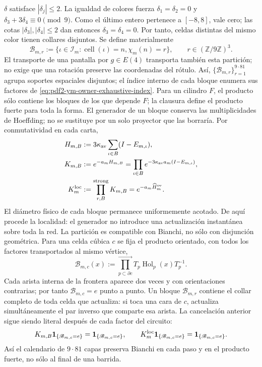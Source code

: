 $\delta$ satisface $|\delta_j|\le2$. La igualdad de colores fuerza
$\delta_1=\delta_2=0$ y
$\delta_3+3\delta_4\equiv0\pmod9$. Como el último entero pertenece a
$[-8,8]$, vale cero; las cotas $|\delta_3|,|\delta_4|\le2$ dan entonces
$\delta_3=\delta_4=0$. Por tanto, celdas distintas del mismo color tienen
collares disjuntos. Se define materialmente
\begin{equation}\label{eq:pdf2-ym-owner-729-blocks}
 \mathcal B_{m,r}:=\{\iota\in\mathcal I_m:
   \operatorname{cell}(\iota)=n, \chi_m(n)=r\},
 \qquad r\in(\mathbb Z/9\mathbb Z)^3.
\end{equation}
El transporte de una pantalla por $g\in E(4)$ transporta también esta
partición; no exige que una rotación preserve las coordenadas del rótulo.
Así, $\{\mathcal B_{m,r}\}_{r=1}^{9\cdot81}$ agrupa soportes espaciales
disjuntos;
el índice interno de cada bloque enumera sus factores de
\eqref{eq:pdf2-ym-owner-exhaustive-index}. Para un cilindro $F$, el producto sólo
contiene los bloques de los que depende $F$; la clausura define el producto fuerte
para toda la forma. El generador de un bloque conserva las multiplicidades de
Hoeffding; no se sustituye por un solo proyector que las borraría. Por
conmutatividad en cada carta,
\begin{equation}\label{eq:pdf2-ym-owner-local-circuit}
\begin{aligned}
 H_{m,B}&:=3\kappa_{\rm av}\sum_{\iota\in B}(I-E_{m,\iota}),\\
 K_{m,B}&:=e^{-a_mH_{m,B}}
 =\prod_{\iota\in B}e^{-3\kappa_{\rm av}a_m(I-E_{m,\iota})},\\
 K_m^{\rm loc}&:=\mathop{\prod_{r,B}}^{\rm strong}K_{m,B}
 =e^{-a_m\widehat H_m^{\rm ov}}.
\end{aligned}
\end{equation}
El diámetro físico de cada bloque permanece uniformemente acotado. De aquí procede
la localidad: el generador no introduce una actualización instantánea sobre toda la
red.
La partición es compatible con Bianchi, no sólo con disjunción geométrica. Para una
celda cúbica $c$ se fija el producto orientado, con todos los factores transportados
al mismo vértice,
\begin{equation}\label{eq:pdf2-ym-owner-bianchi-block-product}
 \mathscr B_{m,c}(x):=
 \prod_{p\subset\partial c}^{\longrightarrow}
 T_p\operatorname{Hol}_p(x)T_p^{-1}.
\end{equation}
Cada arista interna de la frontera aparece dos veces y con orientaciones contrarias;
por tanto $\mathscr B_{m,c}=e$ punto a punto. Un bloque
$\mathcal B_{m,r}$ contiene el collar completo de toda celda que actualiza: si toca
una cara de $c$, actualiza simultáneamente el par inverso que comparte esa arista.
La cancelación anterior sigue siendo literal después de cada factor del circuito:
\begin{equation}\label{eq:pdf2-ym-owner-bianchi-block-invariance}
 K_{m,B}\mathbf1_{\{\mathscr B_{m,c}=e\}}
 =\mathbf1_{\{\mathscr B_{m,c}=e\}},
 \qquad
 K_m^{\rm loc}\mathbf1_{\{\mathscr B_{m,c}=e\}}
 =\mathbf1_{\{\mathscr B_{m,c}=e\}}.
\end{equation}
Así el calendario de $9\cdot81$ capas preserva Bianchi en cada paso y en el producto
fuerte, no sólo al final de una barrida.

